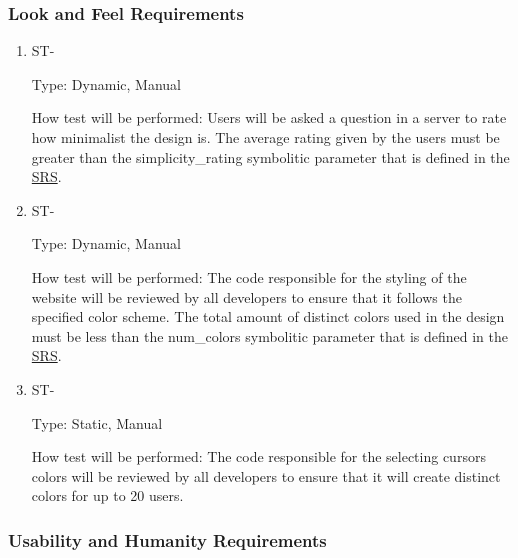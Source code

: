 \documentclass[12pt, titlepage]{article}
\newcounter{TESTID}
\newcommand\TESTNUM{\stepcounter{TESTID}\theTESTID}
\begin{document}
	
	
	\subsubsection{Look and Feel Requirements}
	
	\begin{enumerate}
		
		\item{ST-\TESTNUM\\}
		
		Type: Dynamic, Manual
		
		How test will be performed: Users will be asked a question in a server to rate how minimalist the design is. The average rating given by the users must be greater than the simplicity\_rating symbolitic parameter that is defined in the \href{https://github.com/RutheniumVI/UnderTree/blob/main/docs/SRS/SRS.pdf}{SRS}.
		
		\item{ST-\TESTNUM\\}
		
		Type: Dynamic, Manual
		
		How test will be performed: The code responsible for the styling of the website will be reviewed by all developers to ensure that it follows the specified color scheme. The total amount of distinct colors used in the design must be less than the num\_colors symbolitic parameter that is defined in the \href{https://github.com/RutheniumVI/UnderTree/blob/main/docs/SRS/SRS.pdf}{SRS}.
		
		\item{ST-\TESTNUM\\}
		
		Type: Static, Manual
		
		How test will be performed: The code responsible for the selecting cursors colors will be reviewed by all developers to ensure that it will create distinct colors for up to 20 users.
		
		
	\end{enumerate}
	
	\subsubsection{Usability and Humanity Requirements}
	
\end{document}
